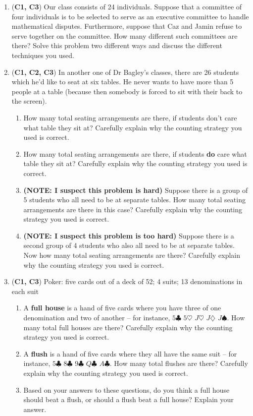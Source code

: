 \documentclass[12pt]{article}
\begin{document}
\begin{enumerate}
\item (\textbf{C1, C3}) Our class consists of 24 individuals. Suppose that a committee of four individuals is to be selected to serve as an executive committee to handle mathematical disputes. Furthermore, suppose that Caz and Jamin refuse to serve together on the committee. How many different such committees are there? Solve this problem two different ways and discuss the different techniques you used.



\item (\textbf{C1, C2, C3}) In another one of Dr Bagley's classes, there are 26 students which he'd like to seat at six tables. He never wants to have more than 5 people at a table (because then somebody is forced to sit with their back to the screen).
\begin{enumerate}
    \item How many total seating arrangements are there, if students don't care what table they sit at? Carefully explain why the counting strategy you used is correct.
    \item How many total seating arrangements are there, if students \textbf{do} care what table they sit at? Carefully explain why the counting strategy you used is correct.
    \item \textbf{(NOTE: I suspect this problem is hard)} Suppose there is a group of 5 students who all need to be at separate tables. How many total seating arrangements are there in this case?  Carefully explain why the counting strategy you used is correct.
    \item \textbf{(NOTE: I suspect this problem is too hard)} Suppose there is a second group of 4 students who also all need to be at separate tables. Now how many total seating arrangements are there? Carefully explain why the counting strategy you used is correct.
\end{enumerate}

\item (\textbf{C1, C3}) Poker: five cards out of a deck of 52; 4 suits; 13 denominations in each suit
\begin{enumerate}
    \item A \textbf{full house} is a hand of five cards where you have three of one denomination and two of another -- for instance, $5\clubsuit$ $5\heartsuit$ $J\heartsuit$ $J\diamondsuit$ $J\spadesuit$. How many total full houses are there? Carefully explain why the counting strategy you used is correct.
    \item A \textbf{flush} is a hand of five cards where they all have the same suit -- for instance, $5 \clubsuit$ $8 \clubsuit$ $9 \clubsuit$ $Q \clubsuit$ $A \clubsuit$. How many total flushes are there? Carefully explain why the counting strategy you used is correct.
    \item Based on your answers to these questions, do you think a full house should beat a flush, or should a flush beat a full house? Explain your answer.
\end{enumerate}


\end{enumerate}
\end{document}

